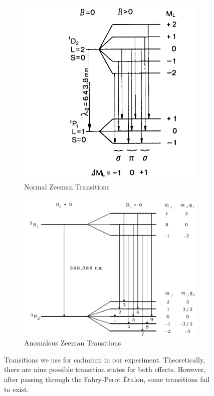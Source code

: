 \documentclass[a4paper,12pt]{article}
\begin{document}
\begin{figure}[H]
    \centering
    \begin{subfigure}[b]{0.45\textwidth}
        \centering
        \includegraphics[width=\textwidth]{Normal_Zeeman.png}
        \caption{Normal Zeeman Transitions}
        \label{fig:normal_zeeman}
    \end{subfigure}
    \hfill
    \begin{subfigure}[b]{0.45\textwidth}
        \centering
        \includegraphics[width=\textwidth]{Anomalous_Zeeman.png}
        \caption{Anomalous Zeeman Transitions}
        \label{fig:anomalous_zeeman}
    \end{subfigure}
    \caption{Transitions we use for cadmium in our experiment. Theoretically, there are nine possible transition states for both effects. However, after passing through the Fabry-Perot Étalon, some transitions fail to exist.\cite{phyweZeeman}}
    \label{fig:zeeman_comparison}
\end{figure}
\end{document}
